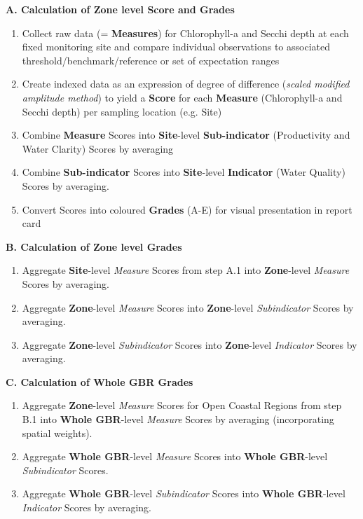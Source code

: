 \begin{minipage}[t]{\textwidth}
\textbf{A. Calculation of Zone level Score and Grades}
\begin{enumerate}
\item Collect raw data (= \textbf{Measures}) for Chlorophyll-a and Secchi depth at each fixed monitoring site and compare individual observations to associated threshold/benchmark/reference or set of expectation ranges
\item Create indexed data as an expression of degree of difference (\textit{scaled modified amplitude method}) to yield a \textbf{Score} for each \textbf{Measure} (Chlorophyll-a and Secchi depth) per sampling location (e.g. Site)
\item Combine \textbf{Measure} Scores into \textbf{Site}-level \textbf{Sub-indicator} (Productivity and Water Clarity) Scores by averaging  
\item Combine \textbf{Sub-indicator} Scores into \textbf{Site}-level \textbf{Indicator} (Water Quality) Scores by averaging.
\item Convert Scores into coloured \textbf{Grades} (A-E) for visual presentation in report card
\end{enumerate}
\textbf{B.     Calculation of Zone level Grades}
\begin{enumerate}
\item Aggregate \textbf{Site}-level \textit{Measure} Scores from step A.1 into \textbf{Zone}-level \textit{Measure} Scores by averaging.
\item Aggregate \textbf{Zone}-level \textit{Measure} Scores into \textbf{Zone}-level \textit{Subindicator} Scores by averaging.
\item Aggregate \textbf{Zone}-level \textit{Subindicator} Scores into \textbf{Zone}-level \textit{Indicator} Scores by averaging.
\end{enumerate}
\textbf{C.     Calculation of Whole GBR Grades}
\begin{enumerate}
\item Aggregate \textbf{Zone}-level \textit{Measure} Scores for Open Coastal Regions from step B.1 into \textbf{Whole GBR}-level \textit{Measure} Scores by averaging (incorporating spatial weights).
\item Aggregate \textbf{Whole GBR}-level \textit{Measure} Scores into \textbf{Whole GBR}-level \textit{Subindicator} Scores.
\item Aggregate \textbf{Whole GBR}-level \textit{Subindicator} Scores into \textbf{Whole GBR}-level \textit{Indicator} Scores by averaging. 
\end{enumerate}
\end{minipage}


\clearpage



\newpage



